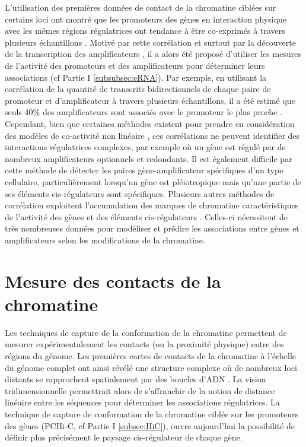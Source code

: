 L’utilisation des premières données de contact de la chromatine ciblées sur certains loci ont montré que les promoteurs des gènes en interaction physique avec les mêmes régions régulatrices ont tendance à être co-exprimés à travers plusieurs échantillons \citep{dekker_capturing_2002, chepelev_characterization_2012, li_extensive_2012}. Motivé par cette corrélation et surtout par la découverte de la transcription des \glspl{amplificateur} \citep{kim_widespread_2010}, il a alors été proposé d’utiliser les mesures de l’activité des promoteurs et des \glspl{amplificateur} pour déterminer leurs associations (cf Partie I \ref{subsubsec:eRNA}). Par exemple, en utilisant la corrélation de la quantité de transcrits bidirectionnels de chaque paire de promoteur et d’\gls{amplificateur} à travers plusieurs échantillons, il a été estimé que seuls 40\% des \glspl{amplificateur} sont associés avec le promoteur le plus proche \citep{andersson_atlas_2014}. Cependant, bien que certaines méthodes existent pour prendre en considération des modèles de co-activité non linéaire \citep{hait_focs_2018}, ces corrélations ne peuvent identifier des interactions régulatrices complexes, par exemple où un gène est régulé par de nombreux \glspl{amplificateur} optionnels et redondants. Il est également difficile par cette méthode de détecter les paires gène-\gls{amplificateur} spécifiques d’un type cellulaire, particulièrement lorsqu’un gène est pléiotropique mais qu’une partie de ses éléments \gls{cis}-régulateurs sont spécifiques. Plusieurs autres méthodes de corrélation exploitent l’accumulation des marques de chromatine caractéristiques de l’activité des gènes et des éléments \gls{cis}-régulateurs \citep{whalen_enhancerpromoter_2016, cao_reconstruction_2017}. Celles-ci nécessitent de très nombreuses données pour modéliser et prédire les associations entre gènes et \glspl{amplificateur} selon les modifications de la chromatine. 

\section{Mesure des contacts de la chromatine}
\label{sec:mesure-contact}

Les techniques de capture de la conformation de la chromatine permettent de mesurer expérimentalement les contacts (ou la proximité physique) entre des régions du génome. Les premières cartes de contacts de la chromatine à l’échelle du génome complet ont ainsi révélé une structure complexe où de nombreux loci distants se rapprochent spatialement par des boucles d’ADN \citep{schoenfelder_pluripotent_2015, mifsud_mapping_2015}. La vision tridimensionnelle permettrait alors de s’affranchir de la notion de distance linéaire entre les séquences pour déterminer les associations régulatrices. La technique de capture de conformation de la chromatine ciblée sur les promoteurs des gènes (\gls{PCHi-C}, cf Partie I \ref{subsec:HiC}), ouvre aujourd’hui la possibilité de définir plus précisément le paysage \gls{cis}-régulateur de chaque gène. \\

